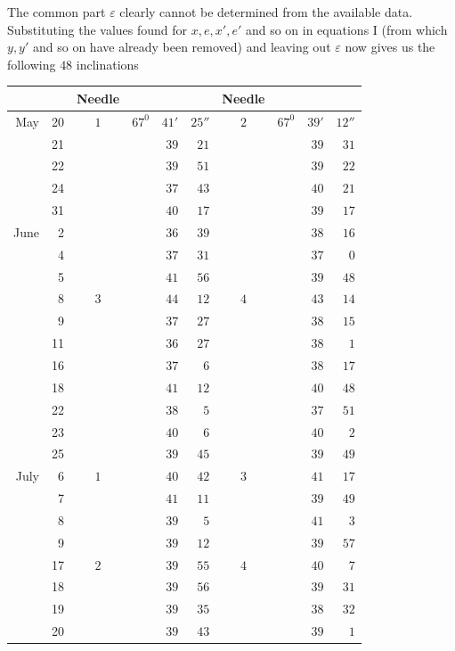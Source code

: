 The common part $\varepsilon$ clearly cannot be determined from the available data. Substituting the values found for $x,e,x',e'$ and so on in equations I (from which $y,y'$ and so on have already been removed) and leaving out $\varepsilon$ now gives us the following $48$ inclinations
\begin{center}
\begin{tabular}{rr|c|rrr||c|rrr}
&&Needle&&&&Needle&&&\\\hline
May&20&$1$&$67^0$&$41'$&$25''$&$2$&$67^0$&$39'$&$12''$\\
&21&&&$39$&$21$&&&$39$&$31$\\
&22&&&$39$&$51$&&&$39$&$22$\\
&24&&&$37$&$43$&&&$40$&$21$\\
&31&&&$40$&$17$&&&$39$&$17$\\
June&2&&&$36$&$39$&&&$38$&$16$\\
&4&&&$37$&$31$&&&$37$&$0$\\
&5&&&$41$&$56$&&&$39$&$48$\\
&8&$3$&&$44$&$12$&$4$&&$43$&$14$\\
&9&&&$37$&$27$&&&$38$&$15$\\
&11&&&$36$&$27$&&&$38$&$1$\\
&16&&&$37$&$6$&&&$38$&$17$\\
&18&&&$41$&$12$&&&$40$&$48$\\
&22&&&$38$&$5$&&&$37$&$51$\\
&23&&&$40$&$6$&&&$40$&$2$\\
&25&&&$39$&$45$&&&$39$&$49$\\
July&6&$1$&&$40$&$42$&$3$&&$41$&$17$\\
&7&&&$41$&$11$&&&$39$&$49$\\
&8&&&$39$&$5$&&&$41$&$3$\\
&9&&&$39$&$12$&&&$39$&$57$\\
&17&$2$&&$39$&$55$&$4$&&$40$&$7$\\
&18&&&$39$&$56$&&&$39$&$31$\\
&19&&&$39$&$35$&&&$38$&$32$\\
&20&&&$39$&$43$&&&$39$&$1$
\end{tabular}
\end{center}

